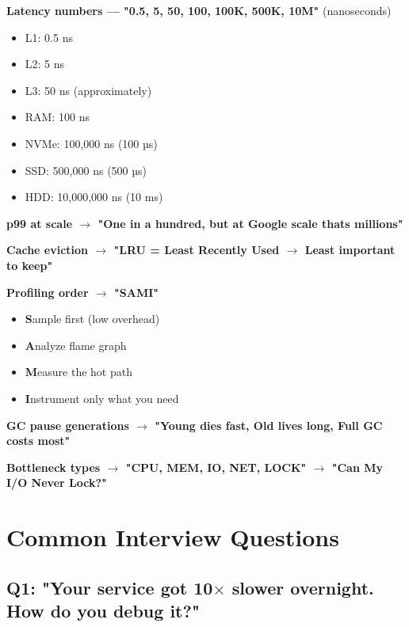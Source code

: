 \documentclass[11pt]{article}
\providecommand{\tightlist}{\setlength{\itemsep}{1pt}\setlength{\parskip}{0pt}}
\begin{document}
\textbf{Latency numbers --- "0.5, 5, 50, 100, 100K, 500K, 10M"} (nanoseconds)

\begin{itemize}
\tightlist
\item
  L1: 0.5 ns
\item
  L2: 5 ns
\item
  L3: 50 ns (approximately)
\item
  RAM: 100 ns
\item
  NVMe: 100,000 ns (100 µs)
\item
  SSD: 500,000 ns (500 µs)
\item
  HDD: 10,000,000 ns (10 ms)
\end{itemize}

\textbf{p99 at scale \(\rightarrow\) "One in a hundred, but at Google scale that\textquotesingle s millions"}

\textbf{Cache eviction \(\rightarrow\) "LRU = Least Recently Used \(\rightarrow\) Least important to keep"}

\textbf{Profiling order \(\rightarrow\) "SAMI"}

\begin{itemize}
\tightlist
\item
  \textbf{S}ample first (low overhead)
\item
  \textbf{A}nalyze flame graph
\item
  \textbf{M}easure the hot path
\item
  \textbf{I}nstrument only what you need
\end{itemize}

\textbf{GC pause generations \(\rightarrow\) "Young dies fast, Old lives long, Full GC costs most"}

\textbf{Bottleneck types \(\rightarrow\) "CPU, MEM, IO, NET, LOCK" \(\rightarrow\) "Can My I/O Never Lock?"}

\section{Common Interview Questions}\label{common-interview-questions}

\subsection{\texorpdfstring{Q1: "Your service got 10\(\times\) slower overnight. How do you debug it?"}{Q1: "Your service got 10\textbackslash times slower overnight. How do you debug it?"}}\label{q1-your-service-got-10times-slower-overnight-how-do-you-debug-it}
\end{document}
